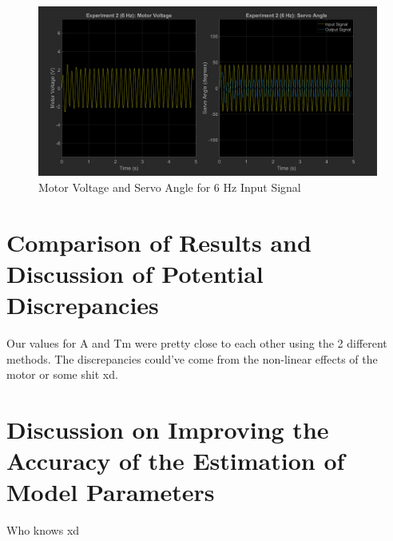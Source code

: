 \documentclass[12pt]{article}
\begin{document}
\begin{figure}[h!]
    \centering
    \includegraphics[width=\textwidth]{exp2_6}
    \caption{\label{fig:exp2_0.5}Motor Voltage and Servo Angle for 6 Hz Input Signal}
\end{figure}
\clearpage

\section*{Comparison of Results and Discussion of Potential Discrepancies}
Our values for A and Tm were pretty close to each other using the 2 different methods. The discrepancies could've come from the non-linear effects of the motor or some shit xd.

\section*{Discussion on Improving the Accuracy of the Estimation of Model Parameters}
Who knows xd
\end{document}
